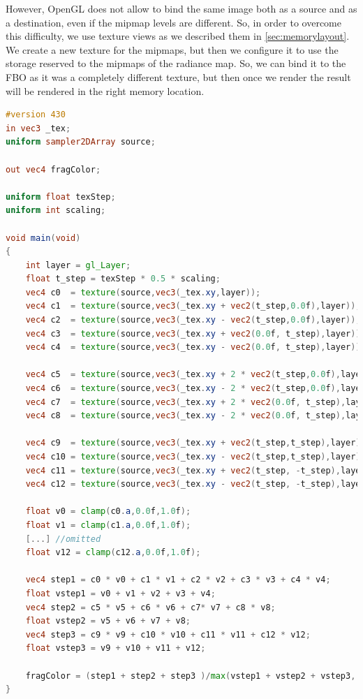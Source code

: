 However, OpenGL does not allow to bind the same image both as a source and as a destination, even if the mipmap levels are different. So, in order to overcome this difficulty, we use texture views as we described them in \ref{sec:memorylayout}. We create a new texture for the mipmaps, but then we configure it to use the storage reserved to the mipmaps of the radiance map. So, we can bind it to the FBO as it was a completely different texture, but then once we render the result will be rendered in the right memory location. %

\begin{lstlisting}[language=GLSL,label=lst:shaderimageprocessing,caption={Custom mipmap filtering on GPU. \gl{_tex} are the texture coordinates on the screen aligned quad.}]
#version 430
in vec3 _tex;
uniform sampler2DArray source;

out vec4 fragColor;

uniform float texStep;
uniform int scaling;

void main(void)
{
	int layer = gl_Layer;
	float t_step = texStep * 0.5 * scaling;
	vec4 c0  = texture(source,vec3(_tex.xy,layer));
	vec4 c1  = texture(source,vec3(_tex.xy + vec2(t_step,0.0f),layer));
	vec4 c2  = texture(source,vec3(_tex.xy - vec2(t_step,0.0f),layer));
	vec4 c3  = texture(source,vec3(_tex.xy + vec2(0.0f, t_step),layer));
	vec4 c4  = texture(source,vec3(_tex.xy - vec2(0.0f, t_step),layer));

	vec4 c5  = texture(source,vec3(_tex.xy + 2 * vec2(t_step,0.0f),layer));
	vec4 c6  = texture(source,vec3(_tex.xy - 2 * vec2(t_step,0.0f),layer));
	vec4 c7  = texture(source,vec3(_tex.xy + 2 * vec2(0.0f, t_step),layer));
	vec4 c8  = texture(source,vec3(_tex.xy - 2 * vec2(0.0f, t_step),layer));

	vec4 c9  = texture(source,vec3(_tex.xy + vec2(t_step,t_step),layer));
	vec4 c10 = texture(source,vec3(_tex.xy - vec2(t_step,t_step),layer));
	vec4 c11 = texture(source,vec3(_tex.xy + vec2(t_step, -t_step),layer));
	vec4 c12 = texture(source,vec3(_tex.xy - vec2(t_step, -t_step),layer));

	float v0 = clamp(c0.a,0.0f,1.0f);
	float v1 = clamp(c1.a,0.0f,1.0f);
	[...] //omitted
	float v12 = clamp(c12.a,0.0f,1.0f);

	vec4 step1 = c0 * v0 + c1 * v1 + c2 * v2 + c3 * v3 + c4 * v4;
	float vstep1 = v0 + v1 + v2 + v3 + v4;
	vec4 step2 = c5 * v5 + c6 * v6 + c7* v7 + c8 * v8;
	float vstep2 = v5 + v6 + v7 + v8;
	vec4 step3 = c9 * v9 + c10 * v10 + c11 * v11 + c12 * v12;
	float vstep3 = v9 + v10 + v11 + v12;

	fragColor = (step1 + step2 + step3 )/max(vstep1 + vstep2 + vstep3, 1.0f);
}
\end{lstlisting}

